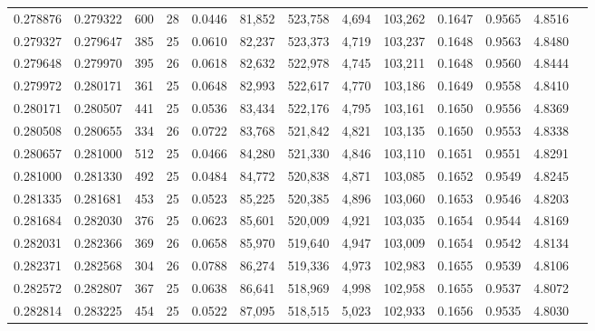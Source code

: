 \begin{tabular}{rrrrrrrrrrrrr}
0.278876 & 0.279322 & 600 &  28 &                                     0.0446 &  81,852 & 523,758 &   4,694 & 103,262 & 0.1647 & 0.9565 & 4.8516 \\
0.279327 & 0.279647 & 385 &  25 &                                     0.0610 &  82,237 & 523,373 &   4,719 & 103,237 & 0.1648 & 0.9563 & 4.8480 \\
0.279648 & 0.279970 & 395 &  26 &                                     0.0618 &  82,632 & 522,978 &   4,745 & 103,211 & 0.1648 & 0.9560 & 4.8444 \\
0.279972 & 0.280171 & 361 &  25 &                                     0.0648 &  82,993 & 522,617 &   4,770 & 103,186 & 0.1649 & 0.9558 & 4.8410 \\
0.280171 & 0.280507 & 441 &  25 &                                     0.0536 &  83,434 & 522,176 &   4,795 & 103,161 & 0.1650 & 0.9556 & 4.8369 \\
0.280508 & 0.280655 & 334 &  26 &                                     0.0722 &  83,768 & 521,842 &   4,821 & 103,135 & 0.1650 & 0.9553 & 4.8338 \\
0.280657 & 0.281000 & 512 &  25 &                                     0.0466 &  84,280 & 521,330 &   4,846 & 103,110 & 0.1651 & 0.9551 & 4.8291 \\
0.281000 & 0.281330 & 492 &  25 &                                     0.0484 &  84,772 & 520,838 &   4,871 & 103,085 & 0.1652 & 0.9549 & 4.8245 \\
0.281335 & 0.281681 & 453 &  25 &                                     0.0523 &  85,225 & 520,385 &   4,896 & 103,060 & 0.1653 & 0.9546 & 4.8203 \\
0.281684 & 0.282030 & 376 &  25 &                                     0.0623 &  85,601 & 520,009 &   4,921 & 103,035 & 0.1654 & 0.9544 & 4.8169 \\
0.282031 & 0.282366 & 369 &  26 &                                     0.0658 &  85,970 & 519,640 &   4,947 & 103,009 & 0.1654 & 0.9542 & 4.8134 \\
0.282371 & 0.282568 & 304 &  26 &                                     0.0788 &  86,274 & 519,336 &   4,973 & 102,983 & 0.1655 & 0.9539 & 4.8106 \\
0.282572 & 0.282807 & 367 &  25 &                                     0.0638 &  86,641 & 518,969 &   4,998 & 102,958 & 0.1655 & 0.9537 & 4.8072 \\
0.282814 & 0.283225 & 454 &  25 &                                     0.0522 &  87,095 & 518,515 &   5,023 & 102,933 & 0.1656 & 0.9535 & 4.8030 \\

\end{tabular}
